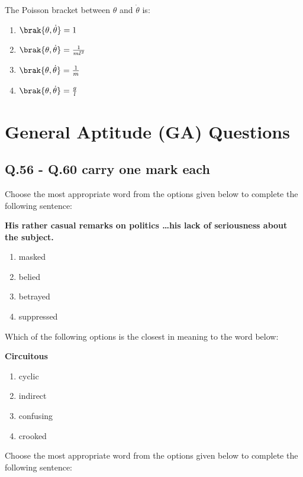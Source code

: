  
    \item The Poisson bracket between $ \theta $ and $ \dot{\theta} $ is:

    \begin{enumerate}
        \item $\brak{\theta, \dot{\theta}} = 1$
        \item $\brak{\theta, \dot{\theta}} = \frac{1}{m l^2}$
         \item $\brak{\theta, \dot{\theta}} = \frac{1}{m}$
        \item $\brak{\theta, \dot{\theta}} = \frac{g}{l}$
    \end{enumerate}

   
\section{General Aptitude (GA) Questions}

\subsection{Q.56 - Q.60 carry one mark each}


    \item Choose the most appropriate word from the options given below to complete the following sentence:

   \textbf{ His rather casual remarks on politics \dots his lack of seriousness about the subject.}

    \begin{enumerate}
        \item masked
        \item belied
        \item betrayed
        \item suppressed
    \end{enumerate}

    \item Which of the following options is the closest in meaning to the word below: 

    \textbf{Circuitous}

    \begin{enumerate}
        \item cyclic
        \item indirect
        \item confusing
        \item crooked
    \end{enumerate}

    \item Choose the most appropriate word from the options given below to complete the following sentence:

